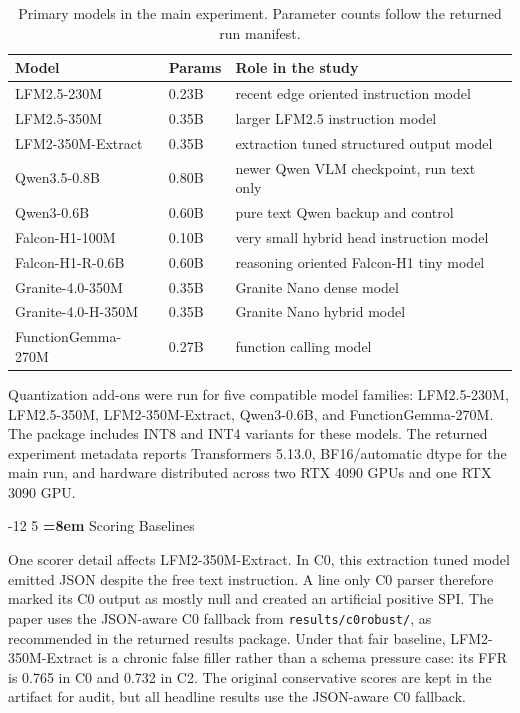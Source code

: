 \documentclass{svproc}
\makeatletter
\newcommand{\spi}{SPI\xspace}
\newcommand{\code}[1]{\texttt{#1}}
\renewcommand\subsection{\@startsection{subsection}{2}{\z@}%
   {-12\p@ \@plus -4\p@ \@minus -4\p@}%
   {5\p@ \@plus 4\p@ \@minus 4\p@}%
   {\normalfont\normalsize\bfseries\boldmath
    \rightskip=\z@ \@plus 8em\pretolerance=10000 }}
\makeatother
\begin{document}
\begin{table}[t]
\centering
\caption{Primary models in the main experiment. Parameter counts follow the returned run manifest.}
\label{tab:models}
\small
\renewcommand{\arraystretch}{0.92}
\begin{tabular}{@{}p{}p{}p{}@{}}
\toprule
Model & Params & Role in the study \\
\midrule
LFM2.5-230M & 0.23B & recent edge oriented instruction model \\
LFM2.5-350M & 0.35B & larger LFM2.5 instruction model \\
LFM2-350M-Extract & 0.35B & extraction tuned structured output model \\
Qwen3.5-0.8B & 0.80B & newer Qwen VLM checkpoint, run text only \\
Qwen3-0.6B & 0.60B & pure text Qwen backup and control \\
Falcon-H1-100M & 0.10B & very small hybrid head instruction model \\
Falcon-H1-R-0.6B & 0.60B & reasoning oriented Falcon-H1 tiny model \\
Granite-4.0-350M & 0.35B & Granite Nano dense model \\
Granite-4.0-H-350M & 0.35B & Granite Nano hybrid model \\
FunctionGemma-270M & 0.27B & function calling model \\
\bottomrule
\end{tabular}
\end{table}

Quantization add-ons were run for five compatible model families: LFM2.5-230M, LFM2.5-350M, LFM2-350M-Extract, Qwen3-0.6B, and FunctionGemma-270M. The package includes INT8 and INT4 variants for these models. The returned experiment metadata reports Transformers 5.13.0, BF16/automatic dtype for the main run, and hardware distributed across two RTX 4090 GPUs and one RTX 3090 GPU.

\subsection{Scoring Baselines}

One scorer detail affects LFM2-350M-Extract. In C0, this extraction tuned model emitted JSON despite the free text instruction. A line only C0 parser therefore marked its C0 output as mostly null and created an artificial positive \spi. The paper uses the JSON-aware C0 fallback from \code{results/c0robust/}, as recommended in the returned results package. Under that fair baseline, LFM2-350M-Extract is a chronic false filler rather than a schema pressure case: its FFR is 0.765 in C0 and 0.732 in C2. The original conservative scores are kept in the artifact for audit, but all headline results use the JSON-aware C0 fallback.
\end{document}
